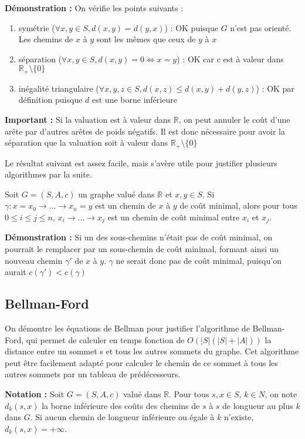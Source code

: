 \documentclass[../../../main.tex]{subfiles}
\begin{document}
\textbf{Démonstration :} On vérifie les points suivants :
\begin{enumerate}
	\item symétrie ($\forall x, y\in S, d(x, y) = d(y, x)$) : OK puisque $G$ n'est pas orienté. Les chemins de $x$ à $y$
sont les mêmes que ceux de $y$ à $x$
	\item séparation ($\forall x, y\in S, d(x, y) = 0\Leftrightarrow x = y$) : OK car c est à valeur dans $\mathbb{R}_+\setminus\{0\}$
	\item inégalité triangulaire ($\forall x, y, z\in S, d(x, z)\leq d(x, y) + d(y, z)$) : OK par définition puisque $d$ est une
borne inférieure
\end{enumerate}
\textbf{Important :} Si la valuation est à valeur dans $\mathbb{R}$, on peut annuler le coût d'une arête par d'autres
arêtes de poids négatifs. Il est donc nécessaire pour avoir la séparation que la valuation soit à valeur
dans $\mathbb{R}_+\setminus\{0\}$

Le résultat suivant est assez facile, mais s'avère utile pour justifier plusieurs algorithmes par la suite.

 Soit $G = (S, A, c)$ un graphe valué dans $\mathbb{R}$ et $x, y\in S$. Si
$\gamma : x = x_0\rightarrow \dots \rightarrow x_n = y$ est un chemin de $x$ à $y$ de coût minimal, alors pour tous $0\leq i \leq j \leq n$,
$x_i\rightarrow \dots \rightarrow x_j$ est un chemin de coût minimal entre $x_i$ et $x_j$.

\textbf{Démonstration :} Si un des sous-chemins n'était pas de coût minimal, on pourrait le remplacer par
un sous-chemin de coût minimal, formant ainsi un nouveau chemin $\gamma'$ de $x$ à $y$. $\gamma$ ne serait donc pas
de coût minimal, puisqu'on aurait $c(\gamma') < c(\gamma)$
\subsection{Bellman-Ford}
On démontre les équations de Bellman pour justifier l'algorithme de Bellman-Ford, qui permet de
calculer en temps fonction de $O(|S|(|S| + |A|))$ la distance entre un sommet s et tous les autres
sommets du graphe. Cet algorithme peut être facilement adapté pour calculer le chemin de ce sommet
à tous les autres sommets par un tableau de prédécesseurs.

\textbf{Notation :} Soit $G = (S, A, c)$ valué dans $\mathbb{R}$. Pour tous $s, x\in S$, $k\in N$, on note $d_k(s, x)$ la borne
inférieure des coûts des chemins de $s$ à $s$ de longueur au plus $k$ dans $G$. Si aucun chemin de longueur
inférieure ou égale à $k$ n'existe, $d_k(s, x) = +\infty$.
\end{document}
